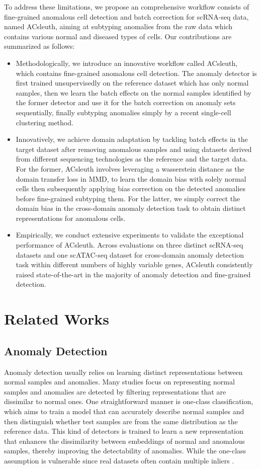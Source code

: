 \documentclass{article}
\begin{document}
To address these limitations, we propose an comprehensive workflow consists of fine-grained anomalous cell 
detection and batch correction for scRNA-seq data, named ACsleuth, aiming at 
subtyping anomalies from the raw data which contains various normal and diseased types of 
cells. Our contributions are summarized as follows:
\begin{itemize}
\item Methodologically, we introduce an innovative workflow called ACsleuth, which contains 
fine-grained anomalous cell detection. The anomaly detector is first trained 
unsupervisedly on the reference dataset which has only normal samples, then we learn 
the batch effects on the normal samples identified by the former detector and use it for 
the batch correction on anomaly sets sequentially, finally subtyping anomalies simply by a recent 
single-cell clustering method.
\item Innovatively, we achieve domain adaptation by tackling batch effects in the target dataset 
after removing anomalous samples and using datasets derived from different sequencing technologies 
as the reference and the target data. For the former, ACsleuth involves leveraging a wasserstein 
distance as the domain transfer loss in MMD, to learn the domain bias with solely normal cells 
then subsequently applying bias correction on the detected anomalies before fine-grained subtyping them. 
For the latter, we simply correct the domain bias in the cross-domain anomaly detection task to obtain 
distinct representations for anomalous cells.
\item Empirically, we conduct extensive experiments to validate the exceptional performance 
of ACsleuth. Across evaluations on three distinct scRNA-seq datasets and one scATAC-seq dataset 
for cross-domain anomaly detection task within different numbers of highly variable genes, 
ACsleuth consistently raised state-of-the-art in the majority of anomaly detection and 
fine-grained detection.
\end{itemize}


\section{Related Works}
\subsection{Anomaly Detection}
Anomaly detection usually relies on learning distinct representations between normal 
samples and anomalies. Many studies focus on representing normal samples and 
anomalies are detected by filtering representations that are dissimilar to normal ones. 
One straightforward manner is one-class classification, which aims to train a model that 
can accurately describe normal samples and then distinguish whether test samples are from 
the same distribution as the reference data. This kind of detectors is trained to learn a 
new representation \cite{RCA,liznerski} that 
enhances the dissimilarity between embeddings of normal and anomalous samples, thereby 
improving the detectability of anomalies. While the one-class assumption is vulnerable 
since real datasets often contain multiple inliers \cite{SLAD}.
\end{document}
